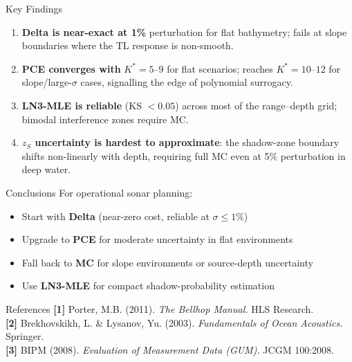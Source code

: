 \documentclass[final]{beamer}
\begin{document}
\begin{frame}[t]{}
{  \vspace{0.6em}
  \begin{alertblock}{Key Findings}
    \begin{enumerate}\itemsep4pt
      \item \textbf{Delta is near-exact at 1\%} perturbation for flat bathymetry;
            fails at slope boundaries where the TL response is non-smooth.
      \item \textbf{PCE converges with} $K^*\!=\!5$--$9$ for flat scenarios;
            reaches $K^*\!=\!10$--$12$ for slope/large-$\sigma$ cases,
            signalling the edge of polynomial surrogacy.
      \item \textbf{LN3-MLE is reliable} (KS $<\!0.05$) across most of the
            range--depth grid; bimodal interference zones require MC.
      \item \textbf{$z_S$ uncertainty is hardest to approximate}:
            the shadow-zone boundary shifts non-linearly with depth,
            requiring full MC even at 5\% perturbation in deep water.
    \end{enumerate}
  \end{alertblock}

  \vspace{0.6em}
  \begin{block}{Conclusions}
    For operational sonar planning:
    \begin{itemize}\itemsep3pt
      \item Start with \textbf{Delta} (near-zero cost, reliable at $\sigma\leq1\%$)
      \item Upgrade to \textbf{PCE} for moderate uncertainty in flat environments
      \item Fall back to \textbf{MC} for slope environments or source-depth uncertainty
      \item Use \textbf{LN3-MLE} for compact shadow-probability estimation
    \end{itemize}
  \end{block}

  \vspace{0.6em}
  \begin{block}{References}
    {\footnotesize
    \textbf{[1]} Porter, M.B. (2011). \textit{The Bellhop Manual.} HLS Research.\\[3pt]
    \textbf{[2]} Brekhovskikh, L. \& Lysanov, Yu. (2003).
      \textit{Fundamentals of Ocean Acoustics.} Springer.\\[3pt]
    \textbf{[3]} BIPM (2008). \textit{Evaluation of Measurement Data (GUM).}
      JCGM 100:2008.
    }
  \end{block}

}%

\end{frame}
\end{document}
